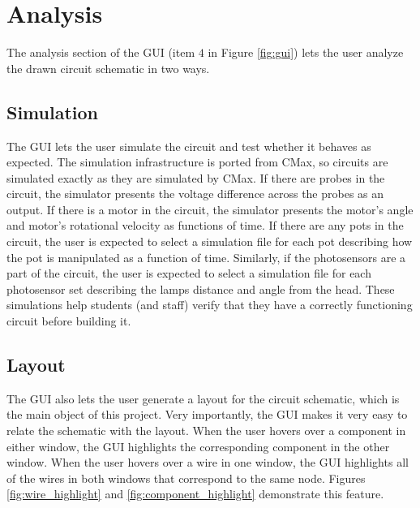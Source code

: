 \section{Analysis}

The analysis section of the GUI (item $4$ in Figure \ref{fig:gui}) lets the user
analyze the drawn circuit schematic in two ways.

\subsection{Simulation}

The GUI lets the user simulate the circuit and test whether it behaves as
expected. The simulation infrastructure is ported from CMax, so circuits
are simulated exactly as they are simulated by CMax. If there are probes in the
circuit, the simulator presents the voltage difference across the probes as an
output. If there is a motor in the circuit, the simulator presents the motor's
angle and motor's rotational velocity as functions of time. If there are any
pots in the circuit, the user is expected to select a simulation file for each
pot describing how the pot is manipulated as a function of time. Similarly,
if the photosensors are a part of the circuit, the user is expected to select
a simulation file for each photosensor set describing the lamps distance and
angle from the head. These simulations help students (and staff) verify that
they have a correctly functioning circuit before building it.

\subsection{Layout}

The GUI also lets the user generate a layout for the circuit schematic, which is
the main object of this project. Very importantly, the GUI makes it very easy to
relate the schematic with the layout. When the user hovers over a component in
either window, the GUI highlights the corresponding component in the other
window. When the user hovers over a wire in one window, the GUI highlights all
of the wires in both windows that correspond to the same node. Figures
\ref{fig:wire_highlight} and \ref{fig:component_highlight} demonstrate this
feature.


